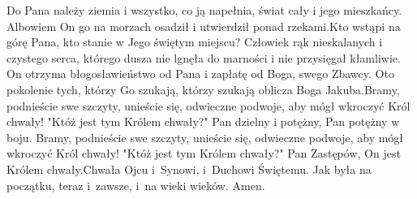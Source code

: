
\startpsalmusx[title={Psalm 24}] %
\startlines
Do Pana należy ziemia i wszystko, co ją napełnia,\pmed
świat cały i jego mieszkańcy.
Albowiem On go na morzach osadził\pmed
i utwierdził ponad rzekami.\startnarrower[5mm]
Kto wstąpi na górę Pana,\pmed
kto stanie w Jego świętym miejscu?
Człowiek rąk nieskalanych i czystego serca,\pflx
którego dusza nie lgnęła do marności\pmed
i nie przysięgał kłamliwie.\stopnarrower
On otrzyma błogosławieństwo od Pana\pmed
i zapłatę od Boga, swego Zbawcy.
Oto pokolenie tych, którzy Go szukają,\pmed
którzy szukają oblicza Boga Jakuba.\startnarrower[5mm]
Bramy, podnieście swe szczyty,\pflx
unieście się, odwieczne podwoje,\pmed
aby mógł wkroczyć Król chwały!
"Któż jest tym Królem chwały?"\pflx
Pan dzielny i potężny,\pmed
Pan potężny w boju.\stopnarrower
Bramy, podnieście swe szczyty,\pflx
unieście się, odwieczne podwoje,\pmed
aby mógł wkroczyć Król chwały!
"Któż jest tym Królem chwały?"\pmed
Pan Zastępów, On jest Królem chwały.\startnarrower[5mm]
Chwała Ojcu i~Synowi,\pmed
i~Duchowi Świętemu.
Jak była na początku, teraz i~zawsze,\pmed
i~na wieki wieków. Amen.\stopnarrower\stoplines
\endinput

